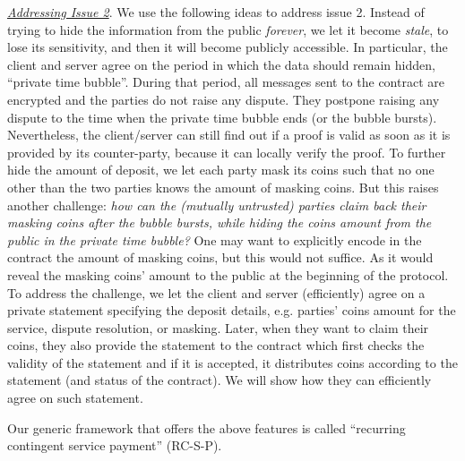 \noindent\underline{\textit{Addressing Issue 2}}. We use the following ideas to address issue 2. Instead of trying to hide the information from the public \emph{forever}, we let it become \emph{stale}, to lose its sensitivity, and then it will become publicly accessible. In particular, the client and server agree on the period in which the data should remain hidden, ``private time bubble''. During that period, all messages sent to the contract are encrypted and the parties do not raise any dispute. They postpone raising any dispute to the time when the private time bubble ends (or the bubble bursts). Nevertheless, the client/server can still find out if a proof is valid as soon as it is provided by its counter-party, because it can locally verify the proof.  To further hide the amount of deposit, we let each party  mask its coins such that no one other than the two parties knows the amount of masking coins.  But this raises another challenge: \textit{how can the (mutually untrusted) parties claim back their masking coins after the bubble bursts, while hiding the coins amount from the public in the private time bubble?} One may want to  explicitly encode in the contract the amount of masking coins, but this would not suffice. As it would reveal the masking coins' amount to the public at the beginning of the protocol. To address the challenge, we let the client and server (efficiently) agree on a private statement specifying the deposit details, e.g. parties' coins amount for the service, dispute resolution, or masking. Later, when they want to claim their coins, they also provide the statement to the contract which first  checks the validity of the statement and if it is accepted, it distributes coins according to the statement (and status of the contract). We will show how they can  efficiently agree on such statement.
 
 Our generic framework that offers the above features is called ``recurring contingent service payment'' (RC-S-P). 
 
 
